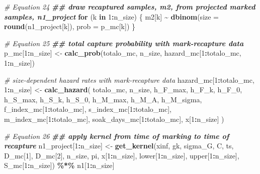 \documentclass[
]{article}
\newenvironment{Shaded}{\begin{snugshade}}{\end{snugshade}}
\newcommand{\AttributeTok}[1]{\textcolor[rgb]{0.13,0.29,0.53}{#1}}
\newcommand{\CommentTok}[1]{\textcolor[rgb]{0.56,0.35,0.01}{\textit{#1}}}
\newcommand{\ControlFlowTok}[1]{\textcolor[rgb]{0.13,0.29,0.53}{\textbf{#1}}}
\newcommand{\DecValTok}[1]{\textcolor[rgb]{0.00,0.00,0.81}{#1}}
\newcommand{\DocumentationTok}[1]{\textcolor[rgb]{0.56,0.35,0.01}{\textbf{\textit{#1}}}}
\newcommand{\FunctionTok}[1]{\textcolor[rgb]{0.13,0.29,0.53}{\textbf{#1}}}
\newcommand{\NormalTok}[1]{#1}
\newcommand{\OtherTok}[1]{\textcolor[rgb]{0.56,0.35,0.01}{#1}}
\newcommand{\SpecialCharTok}[1]{\textcolor[rgb]{0.81,0.36,0.00}{\textbf{#1}}}
\begin{document}
\begin{Shaded}
\begin{Highlighting}[]
  \CommentTok{\# Equation 24}
  \DocumentationTok{\#\# draw recaptured samples, m2, from projected marked samples, n1\_project}
  \ControlFlowTok{for}\NormalTok{ (k }\ControlFlowTok{in} \DecValTok{1}\SpecialCharTok{:}\NormalTok{n\_size) \{}
\NormalTok{    m2[k] }\SpecialCharTok{\textasciitilde{}} \FunctionTok{dbinom}\NormalTok{(}\AttributeTok{size =} \FunctionTok{round}\NormalTok{(n1\_project[k]), }\AttributeTok{prob =}\NormalTok{ p\_mc[k])}
\NormalTok{  \}}

  \CommentTok{\# Equation 25}
  \DocumentationTok{\#\# total capture probability with mark{-}recapture data}
\NormalTok{  p\_mc[}\DecValTok{1}\SpecialCharTok{:}\NormalTok{n\_size] }\OtherTok{\textless{}{-}} \FunctionTok{calc\_prob}\NormalTok{(totalo\_mc, n\_size,}
\NormalTok{                              hazard\_mc[}\DecValTok{1}\SpecialCharTok{:}\NormalTok{totalo\_mc, }\DecValTok{1}\SpecialCharTok{:}\NormalTok{n\_size])}

  \CommentTok{\# size{-}dependent hazard rates with mark{-}recapture data}
\NormalTok{  hazard\_mc[}\DecValTok{1}\SpecialCharTok{:}\NormalTok{totalo\_mc, }\DecValTok{1}\SpecialCharTok{:}\NormalTok{n\_size] }\OtherTok{\textless{}{-}} \FunctionTok{calc\_hazard}\NormalTok{(}
\NormalTok{    totalo\_mc, n\_size, h\_F\_max, h\_F\_k, h\_F\_0, h\_S\_max, h\_S\_k, h\_S\_0, h\_M\_max,}
\NormalTok{    h\_M\_A, h\_M\_sigma, f\_index\_mc[}\DecValTok{1}\SpecialCharTok{:}\NormalTok{totalo\_mc], s\_index\_mc[}\DecValTok{1}\SpecialCharTok{:}\NormalTok{totalo\_mc],}
\NormalTok{    m\_index\_mc[}\DecValTok{1}\SpecialCharTok{:}\NormalTok{totalo\_mc], soak\_days\_mc[}\DecValTok{1}\SpecialCharTok{:}\NormalTok{totalo\_mc], x[}\DecValTok{1}\SpecialCharTok{:}\NormalTok{n\_size]}
\NormalTok{  )}

  \CommentTok{\# Equation 26}
  \DocumentationTok{\#\# apply kernel from time of marking to time of recapture}
\NormalTok{  n1\_project[}\DecValTok{1}\SpecialCharTok{:}\NormalTok{n\_size] }\OtherTok{\textless{}{-}} \FunctionTok{get\_kernel}\NormalTok{(xinf, gk, sigma\_G, C, ts, D\_mc[}\DecValTok{1}\NormalTok{], D\_mc[}\DecValTok{2}\NormalTok{],}
\NormalTok{                                     n\_size, pi, x[}\DecValTok{1}\SpecialCharTok{:}\NormalTok{n\_size], lower[}\DecValTok{1}\SpecialCharTok{:}\NormalTok{n\_size],}
\NormalTok{                                     upper[}\DecValTok{1}\SpecialCharTok{:}\NormalTok{n\_size], S\_mc[}\DecValTok{1}\SpecialCharTok{:}\NormalTok{n\_size]) }\SpecialCharTok{\%*\%}
\NormalTok{    n1[}\DecValTok{1}\SpecialCharTok{:}\NormalTok{n\_size]}


\end{Highlighting}
\end{Shaded}
\end{document}

